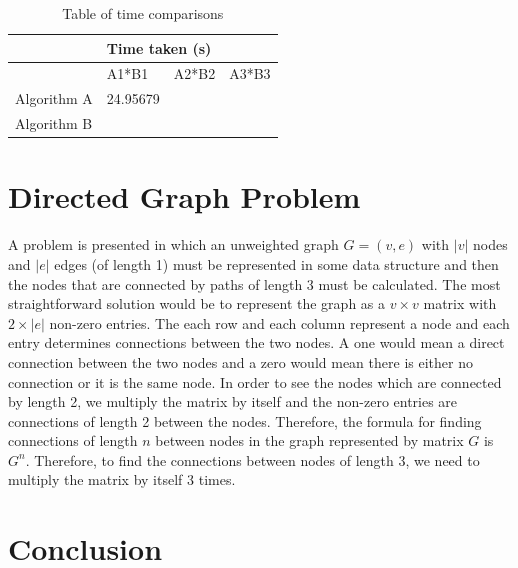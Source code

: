 \documentclass[journal, a4paper]{IEEEtran}
\begin{document}
\begin{table}[]
\centering
\caption{Table of time comparisons}
\label{my-label}
\begin{tabular}{|l|l|l|l|}
\hline
\multirow{2}{*}{} 
                   & \multicolumn{3}{l|}{Time taken (s)}                  \\ \hline
                  & A1*B1         & A2*B2        & A3*B3        \\ \cline{2-4} 
                 
Algorithm A       &   24.95679            &              &              \\ \hline
Algorithm B       &               &              &              \\ \hline
\end{tabular}
\end{table}

\section{Directed Graph Problem}

\noindent
A problem is presented in which an unweighted graph $G=(v,e)$ with $|v|$ nodes and $|e|$ edges (of length 1) must be represented in some data structure and then the nodes that are connected by paths of length 3 must be calculated. The most straightforward solution would be to represent the graph as a $v\times v$ matrix with $2\times|e|$ non-zero entries. The each row and each column represent a node and each entry determines connections between the two nodes. A one would mean a direct connection between the two nodes and a zero would mean there is either no connection or it is the same node. In order to see the nodes which are connected by length 2, we multiply the matrix by itself and the non-zero entries are connections of length 2 between the nodes. Therefore, the formula for finding connections of length $n$ between nodes in the graph represented by matrix $G$ is $G^n$. Therefore, to find the connections between nodes of length 3, we need to multiply the matrix by itself 3 times.




\section{Conclusion}
\end{document}
